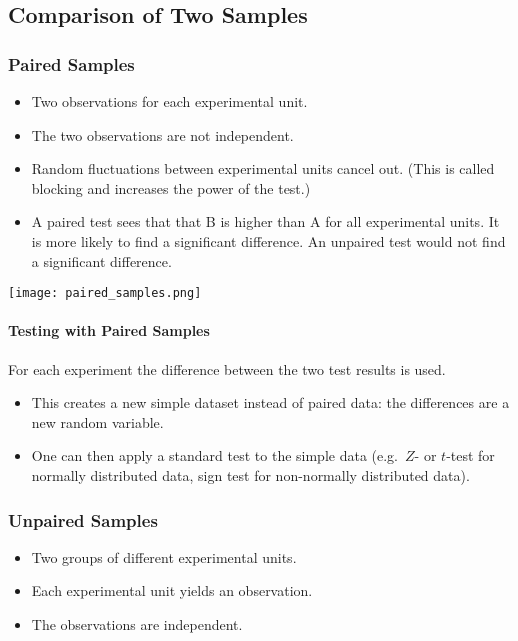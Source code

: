 \subsection{Comparison of Two Samples}


\subsubsection{Paired Samples}

\begin{itemize}
    \item Two observations for each experimental unit.
    \item The two observations are not independent.
    \item Random fluctuations between experimental units cancel out. (This is called blocking and increases the power of the test.)
    \item A paired test sees that that B is higher than A for all experimental units. It is more likely to find a significant difference. An unpaired test would not find a significant difference.
\end{itemize}

\begin{center}
    \texttt{[image: paired\_samples.png]}
\end{center}

\newpar{}
\paragraph{Testing with Paired Samples}

For each experiment the difference between the two test results is used.
\begin{itemize}
    \item This creates a new simple dataset instead of paired data: the differences are a new random variable.
    \item One can then apply a standard test to the simple data (e.g.\ $Z$- or $t$-test for normally distributed data, sign test for non-normally distributed data).
\end{itemize}

\subsubsection{Unpaired Samples}

\begin{itemize}
    \item Two groups of different experimental units.
    \item Each experimental unit yields an observation.
    \item The observations are independent.
\end{itemize}

